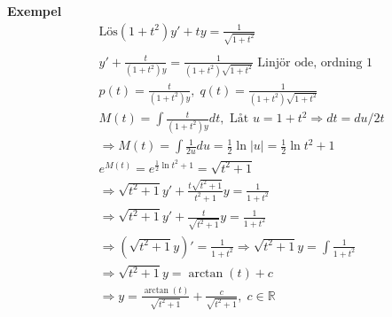 \documentclass{article}
\begin{document}
\textbf{Exempel} 
\begin{align*}
  &\quad  \text{Lös} (1+t^2)y' + ty = \frac{1}{\sqrt{1+t^2}} \\
  &\quad  \\
  &\quad  y'+\frac{t}{(1+t^2)y} = \frac{1}{(1+t^2)\sqrt{1+t^2}} \text{ Linjör ode, ordning 1} \\
  &\quad  p(t)=\frac{t}{(1+t^2)y}, \; q(t)=\frac{1}{(1+t^2)\sqrt{1+t^2}} \\
  &\quad  M(t) = \int \frac{t}{(1+t^2)y}dt, \text{ Låt } u=1+t^2 \Rightarrow dt = du/2t \\
  &\quad  \Rightarrow M(t)=\int\frac{1}{2u}du = \frac{1}{2}\ln{|u|} = \frac{1}{2}\ln{t^2+1} \\
  &\quad  e^{M(t)}=e^{\frac{1}{2}\ln{t^2+1}}=\sqrt{t^2+1} \\
  &\quad  \Rightarrow \sqrt{t^2+1}y'+\frac{t\sqrt{t^2+1}}{t^2+1}y = \frac{1}{1+t^2} \\
  &\quad  \Rightarrow \sqrt{t^2+1}y'+\frac{t}{\sqrt{t^2+1}}y = \frac{1}{1+t^2} \\
  &\quad  \Rightarrow (\sqrt{t^2+1}y)' = \frac{1}{1+t^2} \Rightarrow \sqrt{t^2+1}y = \int\frac{1}{1+t^2} \\
  &\quad  \Rightarrow \sqrt{t^2+1}y = \arctan{(t)} +c \\
  &\quad  \Rightarrow y = \frac{\arctan{(t)}}{\sqrt{t^2+1}} +\frac{c}{{\sqrt{t^2+1}}}, \; c\in\mathbb{R} \\
\end{align*}
\end{document}
